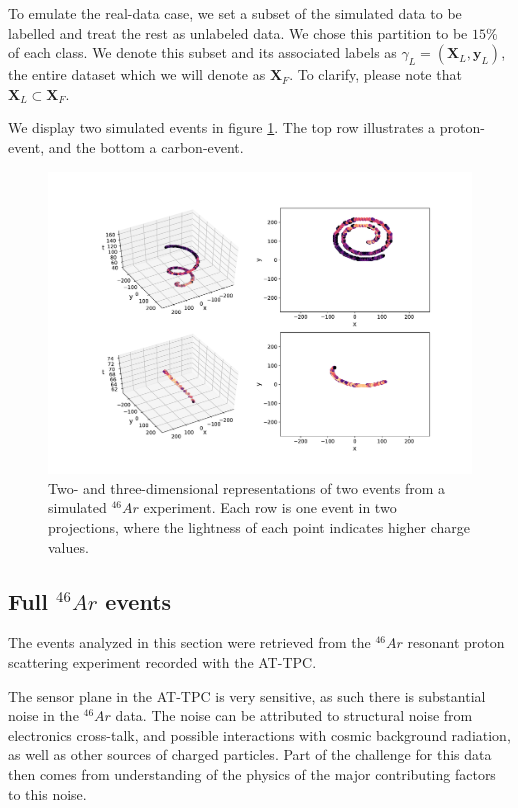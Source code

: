 To emulate the real-data case, we set a subset of the simulated data to be labelled and treat the rest as unlabeled data. We chose this partition to be $15\%$ of each class. We denote this subset and its associated labels as $\gamma_L=(\mathbf{X}_L, \mathbf{y}_L)$, the entire dataset which we will denote as $\mathbf{X}_F$. To clarify, please note that $\mathbf{X}_L \subset \mathbf{X}_F$.

We display two simulated events in figure \ref{fig:sim_samples}. The top row illustrates a proton-event, and the bottom a carbon-event. 

\begin{figure}[H]
\centering
\includegraphics[width=\textwidth]{../plots/display_eventssimulated.pdf}
\caption[Displaying simulated events in 2D and 3D]{Two- and three-dimensional representations of two events from a simulated ${}^{46}Ar$ experiment. Each row is one event in two projections, where the lightness of each point indicates higher charge values.}\label{fig:sim_samples}
\end{figure}


\subsection{Full \texorpdfstring{${}^{46}Ar$}{46Ar}  events}\label{sec:data_real}

The events analyzed in this section were retrieved from the ${}^{46}Ar$ resonant proton scattering experiment recorded with the AT-TPC. 

The sensor plane in the AT-TPC is very sensitive, as such there is substantial noise in the ${}^{46}Ar$ data. The noise can be attributed to structural noise from electronics cross-talk, and possible interactions with cosmic background radiation, as well as other sources of charged particles. Part of the challenge for this data then comes from understanding of the physics of the major contributing factors to this noise. 

